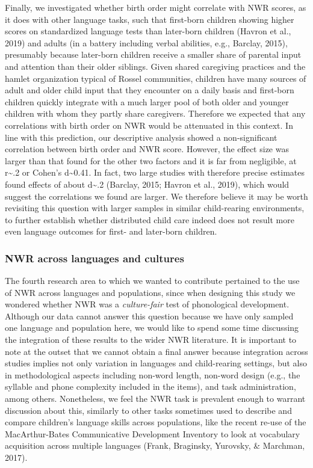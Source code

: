 \documentclass[
  english,
  ,man,floatsintext]{apa6}
\begin{document}
Finally, we investigated whether birth order might correlate with NWR scores, as it does with other language tasks, such that first-born children showing higher scores on standardized language tests than later-born children (Havron et al., 2019) and adults (in a battery including verbal abilities, e.g., Barclay, 2015), presumably because later-born children receive a smaller share of parental input and attention than their older siblings. Given shared caregiving practices and the hamlet organization typical of Rossel communities, children have many sources of adult and older child input that they encounter on a daily basis and first-born children quickly integrate with a much larger pool of both older and younger children with whom they partly share caregivers. Therefore we expected that any correlations with birth order on NWR would be attenuated in this context. In line with this prediction, our descriptive analysis showed a non-significant correlation between birth order and NWR score. However, the effect size was larger than that found for the other two factors and it is far from negligible, at r\textasciitilde.2 or Cohen's d\textasciitilde0.41. In fact, two large studies with therefore precise estimates found effects of about d\textasciitilde.2 (Barclay, 2015; Havron et al., 2019), which would suggest the correlations we found are larger. We therefore believe it may be worth revisiting this question with larger samples in similar child-rearing environments, to further establish whether distributed child care indeed does not result more even language outcomes for first- and later-born children.

\hypertarget{nwr-across-languages-and-cultures}{%
\subsubsection{NWR across languages and cultures}\label{nwr-across-languages-and-cultures}}

The fourth research area to which we wanted to contribute pertained to the use of NWR across languages and populations, since when designing this study we wondered whether NWR was a \emph{culture-fair} test of phonological development. Although our data cannot answer this question because we have only sampled one language and population here, we would like to spend some time discussing the integration of these results to the wider NWR literature. It is important to note at the outset that we cannot obtain a final answer because integration across studies implies not only variation in languages and child-rearing settings, but also in methodological aspects including non-word length, non-word design (e.g., the syllable and phone complexity included in the items), and task administration, among others. Nonetheless, we feel the NWR task is prevalent enough to warrant discussion about this, similarly to other tasks sometimes used to describe and compare children's language skills across populations, like the recent re-use of the MacArthur-Bates Communicative Development Inventory to look at vocabulary acquisition across multiple languages (Frank, Braginsky, Yurovsky, \& Marchman, 2017).
\end{document}

